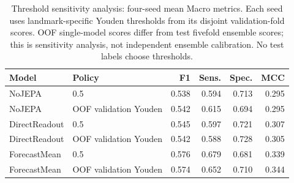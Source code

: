 \begin{table}[t]
\centering
\small
\caption{Threshold sensitivity analysis: four-seed mean Macro metrics. Each seed uses landmark-specific Youden thresholds from its disjoint validation-fold scores. OOF single-model scores differ from test fivefold ensemble scores; this is sensitivity analysis, not independent ensemble calibration. No test labels choose thresholds.}
\label{tab:extended_threshold}
\begin{tabular}{llrrrr}
\toprule
Model & Policy & F1 & Sens. & Spec. & MCC \\
\midrule
NoJEPA & 0.5 & 0.538 & 0.594 & 0.713 & 0.295 \\
NoJEPA & OOF validation Youden & 0.542 & 0.615 & 0.694 & 0.295 \\
\midrule
DirectReadout & 0.5 & 0.545 & 0.597 & 0.721 & 0.307 \\
DirectReadout & OOF validation Youden & 0.542 & 0.588 & 0.728 & 0.305 \\
\midrule
ForecastMean & 0.5 & 0.576 & 0.679 & 0.681 & 0.339 \\
ForecastMean & OOF validation Youden & 0.574 & 0.652 & 0.710 & 0.344 \\
\bottomrule
\end{tabular}
\end{table}
